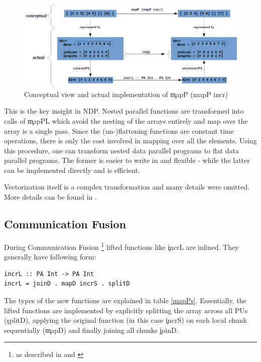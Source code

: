     \begin{figure}[h!]
        \begin{center}
        \includegraphics[width=\linewidth]{mapP.png}
        \caption[Flattening of Nested Parallelism]{Conceptual view and actual implementation of \c{mapP (mapP incr)\footnotemark}}
        \label{figure:mapP}
        \end{center}
    \end{figure}
        
    This is the key insight in NDP. Nested parallel functions are
    transformed into calls of \c{mapPL} which avoid the nesting of
    the arrays entirely and map over the array is a single pass.
    Since the (un-)flattening functions are constant time operations,
    there is only the cost involved in mapping over all the elements.
    Using this procedure, one can transform nested data parallel programs
    to flat data parallel programs. The former is easier to write in and flexible
    - while the latter can be implemented directly and is efficient.
            
    Vectorization itself is a complex transformation and many details were omitted.
    More details can be found in \cite{Harness2008}.
    
  \subsection{Communication Fusion}
    During Communication Fusion
    \footnote{as described in
    \cite{DistTypes1999} and \cite{TypesNested2000}
    }
    lifted functions like \c{incrL} are inlined.
    They generally have following form:
    \begin{lstlisting}
incrL :: PA Int -> PA Int
incrL = joinD . mapD incrS . splitD
    \end{lstlisting}
    The types of the new functions are explained in table \ref{mapPs}.
    Essentially, the lifted functions are implemented by explicitly
    splitting the array across all PUs (\c{splitD}), applying the original
    function (in this case \c{incrS}) on each local chunk sequentially (\c{mapD})
    and finally joining all chunks {\c{joinD}}.
    
